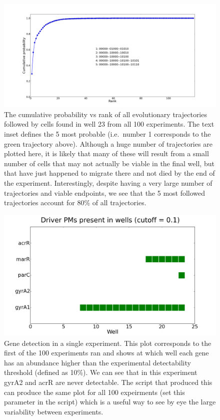 \documentclass[a4paper,10pt]{article}
\begin{document}
 
 
 
 \begin{figure}
  \centering
  \includegraphics[width=0.95\linewidth]{trajectories_cumProb}
\caption{The cumulative probability vs rank of all evolutionary trajectories followed by cells found in well 23 from all 100 experiments.
The text inset defines the 5 most probable (i.e.~number 1 corresponds to the green trajectory above).
Although a huge number of trajectories are plotted here, it is likely that many of these will result from a small number of cells that may not actually
be viable in the final well, but that have just happened to migrate there and not died by the end of the experiment.
Interestingly, despite having a very large number of trajectories and viable endpoints, we see that the 5 most followed trajectories
account for 80\% of all trajectories.}
\label{fig:cumProb}
\end{figure}

 
 
  \begin{figure}
  \centering
  \includegraphics[width=0.95\linewidth]{Experiment_0_cutoff_0p1}
\caption{Gene detection in a single experiment. This plot corresponds to the first of the 100 experiments ran and shows at which well each gene has an
abundance higher than the experimental detectability threshold (defined as 10\%). We can see that in this experiment gyrA2 and acrR are never detectable.
The script that produced this can produce the same plot for all 100 expeirments (set this parameter in the script) which is a useful way to see by eye
the large variability between experiments.}
\label{fig:driverOccurrence}
\end{figure}
\end{document}
